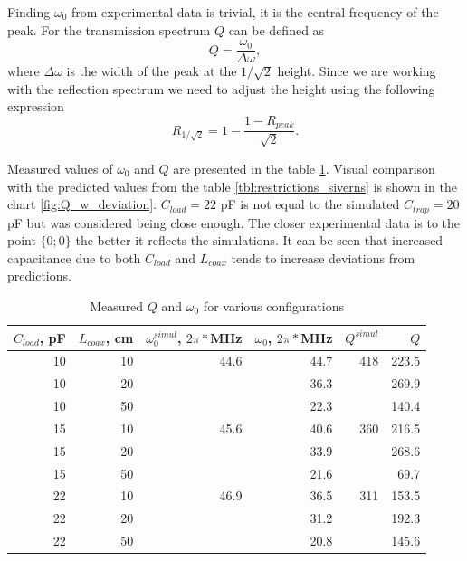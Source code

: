 \FloatBarrier
Finding $\omega_0$ from experimental data is trivial, it is the central frequency of the peak. For the transmission spectrum $Q$ can be defined as
\begin{equation}
	Q = \frac{\omega_0}{\Delta \omega},
\end{equation}
where $\Delta \omega$ is the width of the peak at the $1/\sqrt{2}$ height. Since we are working with the reflection spectrum we need to adjust the height using the following expression
\begin{equation}
	R_{1/\sqrt{2}} = 1 - \frac{1 - R_{peak}}{\sqrt{2}}.
	\label{eq:reflection_height}
\end{equation}

Measured values of $\omega_0$ and $Q$ are presented in the table \ref{tbl:Q_w_results}. Visual comparison with the predicted values from the table \ref{tbl:restrictions_siverns} is shown in the chart \ref{fig:Q_w_deviation}. $C_{load} = 22$ pF is not equal to the simulated $C_{trap} = 20$ pF but was considered being close enough. The closer experimental data is to the point $\{0; 0\}$ the better it reflects the simulations. It can be seen that increased capacitance due to both $C_{load}$ and $L_{coax}$ tends to increase deviations from predictions.
\begin{table}[h]
\centering
\begin{tabular}{| r | r || r | r || r | r |}
	\hline
	$C_{load}$, pF & $L_{coax}$, cm & $\omega^{simul}_0$, $2\pi*$MHz & $\omega_0$, $2\pi*$MHz & $Q^{simul}$ & $Q$\\
	\hline \hline
	10 & 10 & 44.6 & 44.7 & 418 & 223.5\\
	\hline
	10 & 20 & \dittotikz & 36.3 & \dittotikz & 269.9\\
	\hline
	10 & 50 & \dittotikz & 22.3 & \dittotikz & 140.4\\
	\hline
	15 & 10 & 45.6 & 40.6 & 360 & 216.5\\
	\hline
	15 & 20 & \dittotikz & 33.9 & \dittotikz & 268.6\\
	\hline
	15 & 50 & \dittotikz & 21.6 & \dittotikz & 69.7\\
	\hline
	22 & 10 & 46.9 & 36.5 & 311 & 153.5\\
	\hline
	22 & 20 & \dittotikz & 31.2 & \dittotikz & 192.3\\
	\hline
	22 & 50 & \dittotikz & 20.8 & \dittotikz & 145.6\\
	\hline
\end{tabular}
\label{tbl:Q_w_results}
\caption{Measured $Q$ and $\omega_0$ for various configurations}
\end{table}

